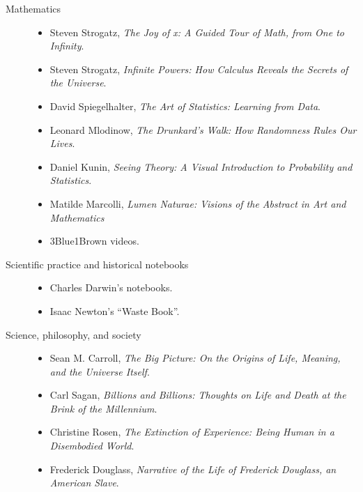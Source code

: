 \begin{description}
    \item[Mathematics]
    \begin{itemize}
        \item Steven Strogatz, \textit{The Joy of x: A Guided Tour of Math, from One to Infinity}.
        \item Steven Strogatz, \textit{Infinite Powers: How Calculus Reveals the Secrets of the Universe}.
        \item David Spiegelhalter, \textit{The Art of Statistics: Learning from Data}.
        \item Leonard Mlodinow, \textit{The Drunkard's Walk: How Randomness Rules Our Lives}.
        \item Daniel Kunin, \textit{Seeing Theory: A Visual Introduction to Probability and Statistics}.
        \item Matilde Marcolli, \textit{Lumen Naturae: Visions of the Abstract in Art and Mathematics}
        \item 3Blue1Brown videos.
    \end{itemize}

    \item[Scientific practice and historical notebooks]
    \begin{itemize}
        \item Charles Darwin's notebooks.
        \item Isaac Newton's ``Waste Book''.
    \end{itemize}

    \item[Science, philosophy, and society]
    \begin{itemize}
        \item Sean M. Carroll, \textit{The Big Picture: On the Origins of Life, Meaning, and the Universe Itself}.
        \item Carl Sagan, \textit{Billions and Billions: Thoughts on Life and Death at the Brink of the Millennium}.
        \item Christine Rosen, \textit{The Extinction of Experience: Being Human in a Disembodied World}.
        \item Frederick Douglass, \textit{Narrative of the Life of Frederick Douglass, an American Slave}.
    \end{itemize}

\end{description}
